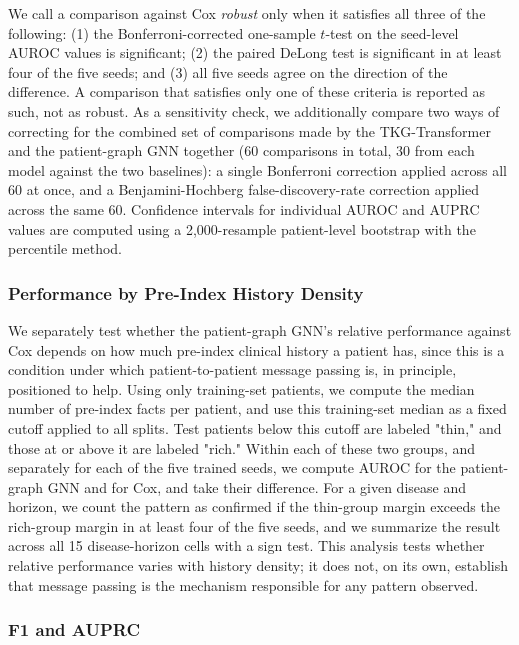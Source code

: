 We call a comparison against Cox \emph{robust} only when it satisfies all three of the following: (1) the Bonferroni-corrected one-sample $t$-test on the seed-level AUROC values is significant; (2) the paired DeLong test is significant in at least four of the five seeds; and (3) all five seeds agree on the direction of the difference. A comparison that satisfies only one of these criteria is reported as such, not as robust. As a sensitivity check, we additionally compare two ways of correcting for the combined set of comparisons made by the TKG-Transformer and the patient-graph GNN together (60 comparisons in total, 30 from each model against the two baselines): a single Bonferroni correction applied across all 60 at once, and a Benjamini-Hochberg false-discovery-rate correction applied across the same 60. Confidence intervals for individual AUROC and AUPRC values are computed using a 2{,}000-resample patient-level bootstrap with the percentile method.

\subsubsection{Performance by Pre-Index History Density}
\label{sec:thinrich}

We separately test whether the patient-graph GNN's relative performance against Cox depends on how much pre-index clinical history a patient has, since this is a condition under which patient-to-patient message passing is, in principle, positioned to help. Using only training-set patients, we compute the median number of pre-index facts per patient, and use this training-set median as a fixed cutoff applied to all splits. Test patients below this cutoff are labeled "thin," and those at or above it are labeled "rich." Within each of these two groups, and separately for each of the five trained seeds, we compute AUROC for the patient-graph GNN and for Cox, and take their difference. For a given disease and horizon, we count the pattern as confirmed if the thin-group margin exceeds the rich-group margin in at least four of the five seeds, and we summarize the result across all 15 disease-horizon cells with a sign test. This analysis tests whether relative performance varies with history density; it does not, on its own, establish that message passing is the mechanism responsible for any pattern observed.

\subsubsection{F1 and AUPRC}
\label{sec:f1auprc}

